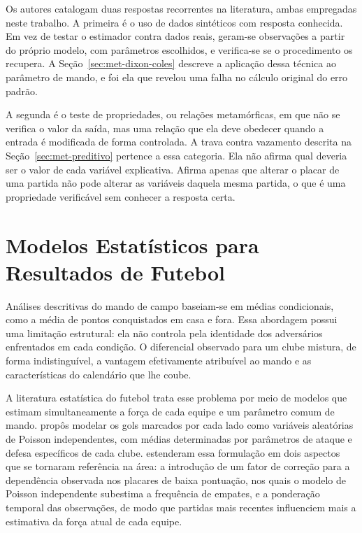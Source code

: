 Os autores catalogam duas respostas recorrentes na literatura, ambas empregadas
neste trabalho. A primeira é o uso de dados sintéticos com resposta conhecida.
Em vez de testar o estimador contra dados reais, geram-se observações a partir
do próprio modelo, com parâmetros escolhidos, e verifica-se se o procedimento os
recupera. A Seção~\ref{sec:met-dixon-coles} descreve a aplicação dessa técnica
ao parâmetro de mando, e foi ela que revelou uma falha no cálculo original do
erro padrão.

A segunda é o teste de propriedades, ou relações metamórficas, em que não se
verifica o valor da saída, mas uma relação que ela deve obedecer quando a
entrada é modificada de forma controlada. A trava contra vazamento descrita na
Seção~\ref{sec:met-preditivo} pertence a essa categoria. Ela não afirma qual
deveria ser o valor de cada variável explicativa. Afirma apenas que alterar o
placar de uma partida não pode alterar as variáveis daquela mesma partida, o que
é uma propriedade verificável sem conhecer a resposta certa.

\section{Modelos Estatísticos para Resultados de Futebol}\label{sec:modelos-futebol}

Análises descritivas do mando de campo baseiam-se em médias condicionais, como a
média de pontos conquistados em casa e fora. Essa abordagem possui uma limitação
estrutural: ela não controla pela identidade dos adversários enfrentados em cada
condição. O diferencial observado para um clube mistura, de forma
indistinguível, a vantagem efetivamente atribuível ao mando e as características
do calendário que lhe coube.

A literatura estatística do futebol trata esse problema por meio de modelos que
estimam simultaneamente a força de cada equipe e um parâmetro comum de mando.
 propôs modelar os gols marcados por cada lado como
variáveis aleatórias de Poisson independentes, com médias determinadas por
parâmetros de ataque e defesa específicos de cada clube.
 estenderam essa formulação em dois aspectos que se
tornaram referência na área: a introdução de um fator de correção para a
dependência observada nos placares de baixa pontuação, nos quais o modelo de
Poisson independente subestima a frequência de empates, e a ponderação temporal
das observações, de modo que partidas mais recentes influenciem mais a estimativa
da força atual de cada equipe.

